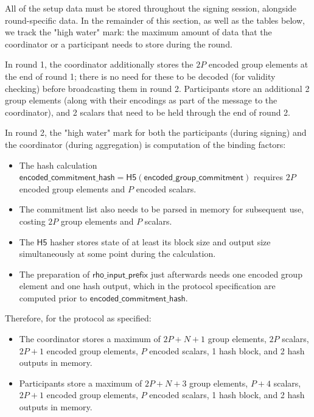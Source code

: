 All of the setup data must be stored throughout the signing session, alongside
round-specific data. In the remainder of this section, as well as the tables
below, we track the "high water" mark: the maximum amount of data that the
coordinator or a participant needs to store during the round.

In round 1, the coordinator additionally stores the $2P$ encoded group elements
at the end of round 1; there is no need for these to be decoded (for validity
checking) before broadcasting them in round 2. Participants store an additional
2 group elements (along with their encodings as part of the message to the
coordinator), and 2 scalars that need to be held through the end of round 2.

In round 2, the "high water" mark for both the participants (during signing) and
the coordinator (during aggregation) is computation of the binding factors:

\begin{itemize}
	\item The hash calculation
	$\mathsf{encoded\_commitment\_hash} = \mathsf{H5}(\mathsf{encoded\_group\_commitment})$
	requires $2P$ encoded group elements and $P$ encoded scalars.
	\item The commitment list also needs to be parsed in memory for subsequent
	use, costing $2P$ group elements and $P$ scalars.
	\item The $\mathsf{H5}$ hasher stores state of at least its block size and
	output size simultaneously at some point during the calculation.
	\item The preparation of $\mathsf{rho\_input\_prefix}$ just afterwards needs
	one encoded group element and one hash output, which in the protocol
	specification are computed prior to $\mathsf{encoded\_commitment\_hash}$.
\end{itemize}

Therefore, for the protocol as specified:

\begin{itemize}
	\item The coordinator stores a maximum of $2P + N + 1$ group elements, $2P$
	scalars, $2P + 1$ encoded group elements, $P$ encoded scalars, 1 hash block,
	and 2 hash outputs in memory.
	\item Participants store a maximum of $2P + N + 3$ group elements, $P + 4$
	scalars, $2P + 1$ encoded group elements, $P$ encoded scalars, 1 hash block,
	and 2 hash outputs in memory.
\end{itemize}

